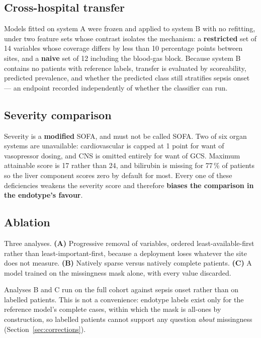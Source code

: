 \documentclass[11pt,letterpaper]{article}
\begin{document}
\subsection{Cross-hospital transfer}

Models fitted on system A were frozen and applied to system B with no refitting, under two
feature sets whose contrast isolates the mechanism: a \textbf{restricted} set of 14
variables whose coverage differs by less than 10 percentage points between sites, and a
\textbf{naive} set of 12 including the blood-gas block. Because system B contains no
patients with reference labels, transfer is evaluated by scoreability, predicted prevalence,
and whether the predicted class still stratifies sepsis onset --- an endpoint recorded
independently of whether the classifier can run.

\subsection{Severity comparison}
\label{sec:severity}

Severity is a \textbf{modified} SOFA, and must not be called SOFA. Two of six organ systems
are unavailable: cardiovascular is capped at 1 point for want of vasopressor dosing, and CNS
is omitted entirely for want of GCS. Maximum attainable score is 17 rather than 24, and
bilirubin is missing for 77\,\% of patients so the liver component scores zero by default
for most. Every one of these deficiencies weakens the severity score and therefore
\textbf{biases the comparison in the endotype's favour}.

\subsection{Ablation}

Three analyses. \textbf{(A)} Progressive removal of variables, ordered
least-available-first rather than least-important-first, because a deployment loses whatever
the site does not measure. \textbf{(B)} Natively sparse versus natively complete patients.
\textbf{(C)} A model trained on the missingness mask alone, with every value discarded.

Analyses B and C run on the full cohort against sepsis onset rather than on labelled
patients. This is not a convenience: endotype labels exist only for the reference model's
complete cases, within which the mask is all-ones by construction, so labelled patients
cannot support any question \emph{about} missingness (Section~\ref{sec:corrections}).
\end{document}

